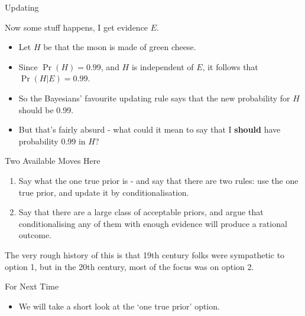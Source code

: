 \documentclass[
  ignorenonframetext,
]{beamer}
\providecommand{\tightlist}{%
  \setlength{\itemsep}{0pt}\setlength{\parskip}{0pt}}
\renewcommand{\,}{\text{, }}
\begin{document}
\begin{frame}{Updating}
\protect\hypertarget{updating}{}

Now some stuff happens, I get evidence \(E\).

\begin{itemize}
\tightlist
\item
  Let \(H\) be that the moon is made of green cheese.
\item
  Since \(\Pr(H) = 0.99\), and \(H\) is independent of \(E\), it follows
  that \(\Pr(H | E) = 0.99\). \pause
\item
  So the Bayesians' favourite updating rule says that the new
  probability for \(H\) should be 0.99. \pause
\item
  But that's fairly absurd - what could it mean to say that I
  \textbf{should} have probability 0.99 in \(H\)?
\end{itemize}

\end{frame}

\begin{frame}{Two Available Moves Here}
\protect\hypertarget{two-available-moves-here}{}

\begin{enumerate}
\tightlist
\item
  Say what the one true prior is - and say that there are two rules: use
  the one true prior, and update it by conditionalisation. \pause
\item
  Say that there are a large class of acceptable priors, and argue that
  conditionalising any of them with enough evidence will produce a
  rational outcome. \pause
\end{enumerate}

The very rough history of this is that 19th century folks were
sympathetic to option 1, but in the 20th century, most of the focus was
on option 2.

\end{frame}

\begin{frame}{For Next Time}
\protect\hypertarget{for-next-time}{}

\begin{itemize}
\tightlist
\item
  We will take a short look at the `one true prior' option.
\end{itemize}

\end{frame}
\end{document}
